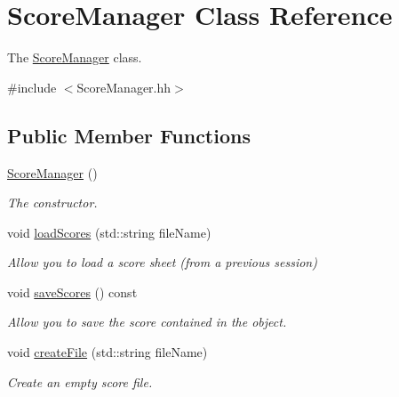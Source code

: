 \hypertarget{classScoreManager}{}\section{Score\+Manager Class Reference}
\label{classScoreManager}


The \hyperlink{classScoreManager}{Score\+Manager} class.  




{\ttfamily \#include $<$Score\+Manager.\+hh$>$}

\subsection*{Public Member Functions}
\begin{DoxyCompactItemize}
\item 
\mbox{\label{classScoreManager_a4f3866ff832127664543349da5c4fbf4}} 
\hyperlink{classScoreManager_a4f3866ff832127664543349da5c4fbf4}{Score\+Manager} ()
\begin{DoxyCompactList}\small\item\em The constructor. \end{DoxyCompactList}\item 
void \hyperlink{classScoreManager_a4c345e9d06ef6f7fb937c43fa51dddd5}{load\+Scores} (std\+::string file\+Name)
\begin{DoxyCompactList}\small\item\em Allow you to load a score sheet (from a previous session) \end{DoxyCompactList}\item 
\mbox{\label{classScoreManager_aa3f390fe5076324b2d457de0c43af59f}} 
void \hyperlink{classScoreManager_aa3f390fe5076324b2d457de0c43af59f}{save\+Scores} () const
\begin{DoxyCompactList}\small\item\em Allow you to save the score contained in the object. \end{DoxyCompactList}\item 
void \hyperlink{classScoreManager_abbe17770ef85b2575fd14acf90a0bc9f}{create\+File} (std\+::string file\+Name)
\begin{DoxyCompactList}\small\item\em Create an empty score file. \end{DoxyCompactList}\item 

\end{DoxyCompactItemize}
